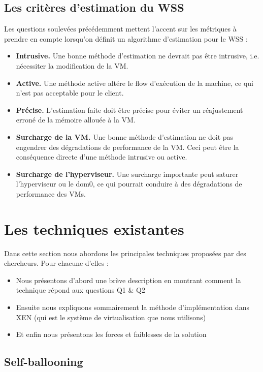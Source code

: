 \subsection{Les critères d'estimation du WSS}
Les questions soulevées précédemment mettent l'accent sur les métriques à prendre en compte lorsqu'on définit un algorithme d'estimation pour le WSS :
\begin{itemize}[label=, font=\large]
    \item \textbf{Intrusive.} Une bonne méthode d'estimation ne devrait pas être intrusive, i.e. nécessiter la modification de la VM.
    \item \textbf{Active.} Une méthode active altére le flow d'exécution de la machine, ce qui n'est pas acceptable pour le client.
    \item \textbf{Précise.} L'estimation faite doit être précise pour éviter un réajustement erroné de la mémoire allouée à la VM.
    \item \textbf{Surcharge de la VM.} Une bonne méthode d'estimation ne doit pas engendrer des dégradations de performance de la VM. Ceci peut être la conséquence directe d'une méthode intrusive ou active.
    \item \textbf{Surcharge de l'hyperviseur.} Une surcharge importante peut saturer l'hyperviseur ou le dom0, ce qui pourrait conduire à des dégradations de performance des VMs.
\end{itemize}

\section{Les techniques existantes}
Dans cette section nous abordons les principales techniques proposées par des chercheurs. Pour chacune d'elles :
\begin{itemize}
    \item Nous présentons d'abord une brève description en montrant comment la technique répond aux questions Q1 \& Q2
    \item Ensuite nous expliquons sommairement la méthode d'implémentation dans XEN (qui est le système de virtualisation que nous utilisons)
    \item Et enfin nous présentons les forces et faiblesses de la solution
\end{itemize}  

\subsection{Self-ballooning}

